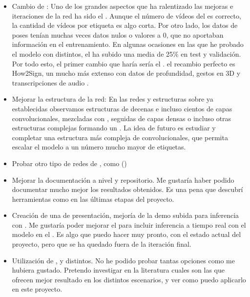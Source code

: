 \begin{itemize}
  \item Cambio de : Uno de los grandes aspectos que ha ralentizado las mejoras e iteraciones de la red ha sido el . Aunque el número de vídeos del  es correcto, la cantidad de vídeos por etiqueta es algo corta. Por otro lado, los datos de poses tenían muchas veces datos nulos o valores a 0, que no aportaban información en el entrenamiento. En algunas ocasiones en las que he probado el modelo con  distintos, el  ha subido una media de 25\% en test y validación. Por todo esto, el primer cambio que haría sería el . el recambio perfecto es How2Sign, un  mucho más extenso con datos de profundidad, gestos en 3D y transcripciones de audio .

  \item Mejorar la estructura de la red: En las redes y estructuras sobre  ya establecidas observamos estructuras de decenas e incluso cientos de capas convolucionales, mezcladas con , seguidas de capas densas o incluso otras estructuras complejas formando un . La idea de futuro es estudiar y completar una estructura más compleja de convolucionales, que permita escalar el modelo a un número mucho mayor de etiquetas.

  \item Probar otro tipo de redes de , como  ()

  \item Mejorar la documentación a nivel  y repositorio. Me gustaría haber podido documentar mucho mejor los resultados obtenidos. Es una pena que descubrí herramientas como  en las últimas etapas del proyecto.

  \item Creación de una  de presentación, mejoría de la demo subida para inferencia con . Me gustaría poder mejorar el  para incluir inferencia a tiempo real con el modelo en el . Es algo que puedo hacer muy pronto, con el estado actual del proyecto, pero que se ha quedado fuera de la iteración final.

  \item Utilización de ,  y  distintos. No he podido probar tantas opciones como me hubiera gustado. Pretendo investigar en la literatura cuales son las que ofrecen mejor resultado en los distintos escenarios, y ver como puedo aplicarlo en este proyecto.


\end{itemize}

